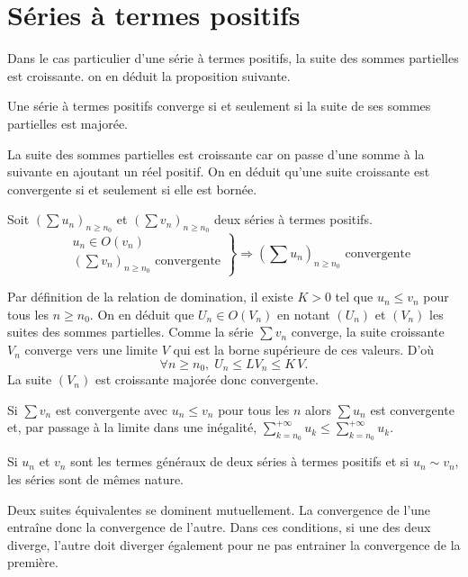\section{Séries à termes positifs}
Dans le cas particulier d'une série à termes positifs, la suite des sommes partielles est croissante. on en déduit la proposition suivante.
\begin{prop}
  Une série à termes positifs converge si et seulement si la suite de ses sommes partielles est majorée.
\end{prop}
\begin{demo}
 La suite des sommes partielles est croissante car on passe d'une somme à la suivante en ajoutant un réel positif. On en déduit qu'une suite croissante est convergente si et seulement si elle est bornée.
\end{demo}
\clearpage
\begin{prop}
  Soit $\left( \sum u_n\right)_{n\geq n_0}$ et $\left( \sum v_n\right)_{n\geq n_0}$ deux séries à termes positifs.
\begin{displaymath}
  \left. 
  \begin{aligned}
    &u_n \in O(v_n) \\ &\left( \sum v_n\right)_{n\geq n_0} \text{ convergente}
  \end{aligned}
  \right\rbrace 
\Rightarrow \left( \sum u_n\right)_{n\geq n_0} \text{ convergente}
\end{displaymath}
\end{prop}
\begin{demo}
Par définition de la relation de domination, il existe $K>0$ tel que $u_n \leq v_n$ pour tous les $n \geq n_0$. On en déduit que $U_n \in O(V_n)$ en notant $(U_n)$ et $(V_n)$ les suites des sommes partielles. Comme la série $\sum v_n$ converge, la suite croissante $V_n$ converge vers une limite $V$ qui est la borne supérieure de ces valeurs. D'où
\[
 \forall n \geq n_0, \; U_n \leq LV_n \leq K\, V.
\]
La suite $(V_n)$ est croissante majorée donc convergente.
\end{demo}
\begin{rem}
 Si $\sum v_n$ est convergente avec $u_n \leq v_n$ pour tous les $n$ alors $\sum u_n$ est convergente et, par passage à la limite dans une inégalité, $\sum_{k=n_0}^{+\infty} u_k \leq \sum_{k=n_0}^{+\infty} u_k$.
\end{rem}
\newpage
\begin{prop}
  Si $u_n$ et $v_n$ sont les termes généraux de deux séries à termes positifs et si $u_n \sim v_n$, les séries sont de mêmes nature.
\end{prop}
\begin{demo}
  Deux suites équivalentes se dominent mutuellement. La convergence de l'une entraîne donc la convergence de l'autre. Dans ces conditions, si une des deux diverge, l'autre doit diverger également pour ne pas entrainer la convergence de la première.
\end{demo}

